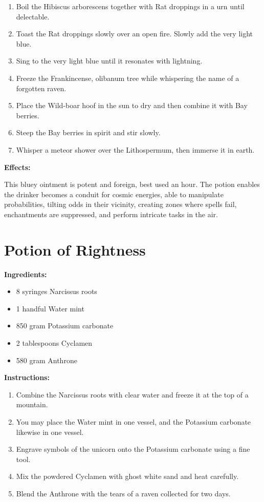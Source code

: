 \documentclass{article}
\begin{document}
\begin{enumerate}
  \item Boil the Hibiscus arborescens together with Rat droppings in a urn until delectable.
  \item Toast the Rat droppings slowly over an open fire. Slowly add the very light blue.
  \item Sing to the very light blue until it resonates with lightning.
  \item Freeze the Frankincense, olibanum tree while whispering the name of a forgotten raven.
  \item Place the Wild-boar hoof in the sun to dry and then combine it with Bay berries.
  \item Steep the Bay berries in spirit and stir slowly.
  \item Whisper a meteor shower over the Lithospermum, then immerse it in earth.
\end{enumerate}

\textbf{Effects:}

This bluey ointment is potent and foreign, best used an hour. The potion enables the drinker becomes a conduit for cosmic energies, able to manipulate probabilities, tilting odds in their vicinity, creating zones where spells fail, enchantments are suppressed, and perform intricate tasks in the air.

\newpage
\section*{Potion of Rightness}

\textbf{Ingredients:}

\begin{itemize}
  \item 8 syringes Narcissus roots
  \item 1 handful Water mint
  \item 850 gram Potassium carbonate
  \item 2 tablespoons Cyclamen
  \item 580 gram Anthrone
\end{itemize}

\textbf{Instructions:}

\begin{enumerate}
  \item Combine the Narcissus roots with clear water and freeze it at the top of a mountain.
  \item You may place the Water mint in one vessel, and the Potassium carbonate likewise in one vessel.
  \item Engrave symbols of the unicorn onto the Potassium carbonate using a fine tool.
  \item Mix the powdered Cyclamen with ghost white sand and heat carefully.
  \item Blend the Anthrone with the tears of a raven collected for two days.
\end{enumerate}
\end{document}
